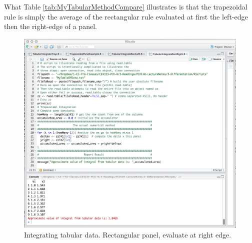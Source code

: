 What Table \ref{tab:MyTabularMethodCompare} illustrates is that the trapezoidal rule is simply the average of the rectangular rule evaluated at first the left-edge then the right-edge of a panel.   

\begin{figure}[t!] %
   \centering
   \includegraphics[width=6in]{./3-Differentation/MyRectRight.jpg} 
   \caption{Integrating tabular data.   Rectangular panel, evaluate at right edge.}
   \label{fig:MyRectRight}
\end{figure}

